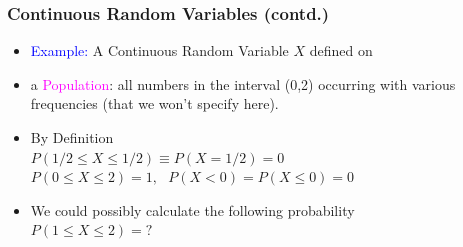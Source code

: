 \documentclass[xcolor=dvipsnames,12pt]{beamer}
\begin{document}
\begin{frame}
\frametitle{Continuous Random Variables (contd.)}
\begin{itemize}
\item \textcolor{blue}{Example:} A Continuous Random Variable $X$ defined on 
\item a \textcolor{magenta}{Population}: all numbers in the interval (0,2) occurring with various
frequencies (that we won't specify here).
\item By Definition\\
$P(1/2 \leq X \leq 1/2) \equiv P(X = 1/2) = 0$ \\
$P(0 \leq X \leq 2) = 1,\ \ \ P(X < 0) = P(X \leq 0) = 0$ 
\item  We could possibly calculate the following probability\\ $P(1 \leq X \leq 2) = ?$
\end{itemize}
\end{frame}
\end{document}
